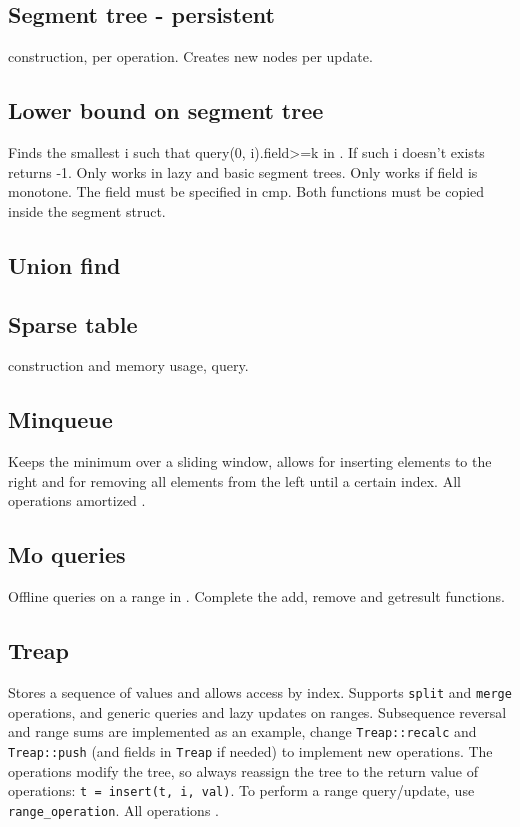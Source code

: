 \subsection{Segment tree - persistent}
 construction,  per operation.
Creates  new nodes per update.


\subsection{Lower bound on segment tree}
Finds the smallest i such that query(0, i).field>=k in .
If such i doesn't exists returns -1. 
Only works in lazy and basic segment trees.
Only works if field is monotone. The field must be specified in cmp.
Both functions must be copied inside the segment struct. 



\subsection{Union find}


\subsection{Sparse table}
 construction and memory usage,  query.


\subsection{Minqueue}
Keeps the minimum over a sliding window, allows for inserting elements to the right and for removing all elements from the left until a certain index. All operations amortized .


\subsection{Mo queries}
Offline queries on a range in . Complete the add, remove and getresult functions.


\subsection{Treap}

Stores a sequence of values and allows access by index. Supports \texttt{split} and \texttt{merge} operations, and generic queries and lazy updates on ranges. Subsequence reversal and range sums are implemented as an example, change \texttt{Treap::recalc} and \texttt{Treap::push} (and fields in \texttt{Treap} if needed) to implement new operations.
The operations modify the tree, so always reassign the tree to the return value of operations: \texttt{t = insert(t, i, val)}. To perform a range query/update, use \texttt{range\_operation}.
All operations .

